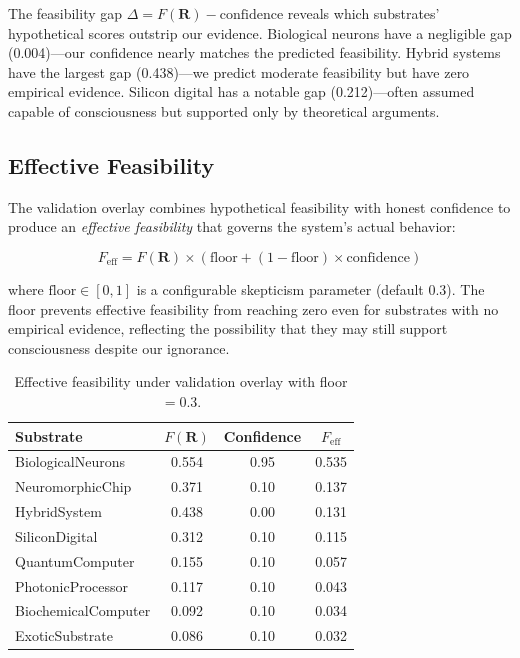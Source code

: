 \documentclass[12pt,a4paper]{article}
\begin{document}
The feasibility gap $\Delta = F(\mathbf{R}) - \text{confidence}$ reveals which substrates' hypothetical scores outstrip our evidence. Biological neurons have a negligible gap (0.004)---our confidence nearly matches the predicted feasibility. Hybrid systems have the largest gap (0.438)---we predict moderate feasibility but have zero empirical evidence. Silicon digital has a notable gap (0.212)---often assumed capable of consciousness but supported only by theoretical arguments.

\subsection{Effective Feasibility}

The validation overlay combines hypothetical feasibility with honest confidence to produce an \emph{effective feasibility} that governs the system's actual behavior:

\begin{equation}
F_{\text{eff}} = F(\mathbf{R}) \times \left(\text{floor} + (1 - \text{floor}) \times \text{confidence}\right)
\label{eq:effective}
\end{equation}

where $\text{floor} \in [0, 1]$ is a configurable skepticism parameter (default 0.3). The floor prevents effective feasibility from reaching zero even for substrates with no empirical evidence, reflecting the possibility that they may still support consciousness despite our ignorance.

\begin{table}[H]
\centering
\caption{Effective feasibility under validation overlay with floor $= 0.3$.}
\label{tab:effective}
\begin{tabular}{lccc}
\toprule
\textbf{Substrate} & \textbf{$F(\mathbf{R})$} & \textbf{Confidence} & \textbf{$F_{\text{eff}}$} \\
\midrule
BiologicalNeurons & 0.554 & 0.95 & 0.535 \\
NeuromorphicChip & 0.371 & 0.10 & 0.137 \\
HybridSystem & 0.438 & 0.00 & 0.131 \\
SiliconDigital & 0.312 & 0.10 & 0.115 \\
QuantumComputer & 0.155 & 0.10 & 0.057 \\
PhotonicProcessor & 0.117 & 0.10 & 0.043 \\
BiochemicalComputer & 0.092 & 0.10 & 0.034 \\
ExoticSubstrate & 0.086 & 0.10 & 0.032 \\
\bottomrule
\end{tabular}
\end{table}
\end{document}
